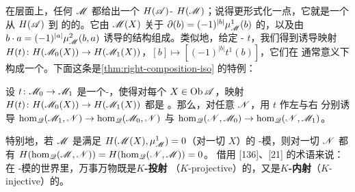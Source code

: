 在\trCohomology{}层面上，任何 $\mathscr{M}$ 都给出一个\trNonunital{}%
$H(\mathscr{A})$-\trModule{} $H(\mathscr{M})$；说得更形式化一点，它就是一个从 $H(\mathscr{A})$ 到%
\trGraded\trVectorSpace{}的\trCategory{}的\trNonunital\trContravariant\trFunctor。它由 $\mathscr{M}(X)$
关于 $\partial(b)=(-1)^{|b|}\mu^1_{\mathscr{M}}(b)$ 的\trCohomology，以及由
$b\cdot a=(-1)^{|a|}\mu^2_{\mathscr{M}}(b,a)$ 诱导的\trModule{}结构组成。类似地，给定%
\trAinfty-\trModule\trHomomorphism{} $t$，我们得到诱导映射
$H(t)\colon H(\mathscr{M}_0(X))\to H(\mathscr{M}_1(X))$，$[b]\mapsto[(-1)^{|b|}t^1(b)]$，它们在
通常意义下构成一个\trModule\trHomomorphism。下面这条是\cref{thm:right-composition-iso}
的特例：
\begin{lemma}\label{thm:module-composition-quasiisomorphism}
设 $t\colon\mathscr{M}_0\to\mathscr{M}_1$ 是一个\trAinfty-\trModule\trHomomorphism，使得对每个
$X\in\operatorname{Ob}\mathscr{A}$，映射 $H(t)\colon H(\mathscr{M}_0(X))\to H(\mathscr{M}_1(X))$ 都是%
\trIsomorphism。那么，对任意 $\mathscr{N}$，用 $t$ 作左\trComposition{}与右\trComposition{}%
分别诱导\trQuasiisomorphism{}%
$\hom_{\mathscr{Q}}(\mathscr{M}_1,\mathscr{N})\to\hom_{\mathscr{Q}}(\mathscr{M}_0,\mathscr{N})$ 与
$\hom_{\mathscr{Q}}(\mathscr{N},\mathscr{M}_0)\to\hom_{\mathscr{Q}}(\mathscr{N},\mathscr{M}_1)$。
\noqed
\end{lemma}
特别地，若 $\mathscr{M}$ 是满足 $H(\mathscr{M}(X),\mu^1_{\mathscr{M}})=0$（对一切 $X$）的\trNonunital{}
\trAinfty-模，则对一切 $\mathscr{N}$ 都有
$H(\hom_{\mathscr{Q}}(\mathscr{M},\mathscr{N}))=H(\hom_{\mathscr{Q}}(\mathscr{N},\mathscr{M}))=0$。
借用 [136]、[21] 的术语来说：在 \trAinfty-模的世界里，万事万物既是\textbf{$K$-投射}
（$K$-projective）的，又是\textbf{$K$-内射}（$K$-injective）的。
